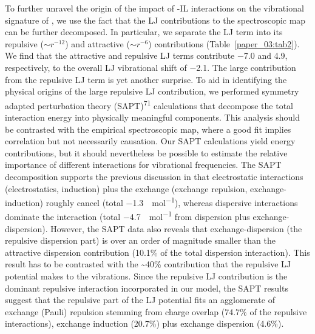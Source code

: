 \documentclass[]{article}
\begin{document}
To further unravel the origin of the impact of -IL interactions on the vibrational signature of , we use the fact that the LJ contributions to the spectroscopic map can be further decomposed. In particular, we separate the LJ term into its repulsive (\({\sim r}^{-12}\)) and attractive (\(\sim r^{-6}\)) contributions (Table~\ref{paper_03:tab2}). We find that the attractive and repulsive LJ terms contribute \SI{-7.0}{\wavenumber} and \SI{+4.9}{\wavenumber}, respectively, to the overall LJ vibrational shift of \SI{-2.1}{\wavenumber}. The large contribution from the repulsive LJ term is yet another surprise. To aid in identifying the physical origins of the large repulsive LJ contribution, we performed symmetry adapted perturbation theory (SAPT)\textsuperscript{71} calculations that decompose the total interaction energy into physically meaningful components. This analysis should be contrasted with the empirical spectroscopic map, where a good fit implies correlation but not necessarily causation. Our SAPT calculations yield energy contributions, but it should nevertheless be possible to estimate the relative importance of different interactions for vibrational frequencies. The SAPT decomposition supports the previous discussion in that electrostatic interactions (electrostatics, induction) plus the exchange (exchange repulsion, exchange-induction) roughly cancel (total \SI{-1.3}{\kcal\per\mole}), whereas dispersive interactions dominate the interaction (total \SI{-4.7}{\kcal\per\mole} from dispersion plus exchange-dispersion). However, the SAPT data also reveals that exchange-dispersion (the repulsive dispersion part) is over an order of magnitude smaller than the attractive dispersion contribution (10.1\% of the total dispersion interaction). This result has to be contrasted with the \textasciitilde{}40\% contribution that the repulsive LJ potential makes to the vibrations. Since the repulsive LJ contribution is the dominant repulsive interaction incorporated in our model, the SAPT results suggest that the repulsive part of the LJ potential fits an agglomerate of exchange (Pauli) repulsion stemming from charge overlap (74.7\% of the repulsive interactions), exchange induction (20.7\%) plus exchange dispersion (4.6\%).
\end{document}

